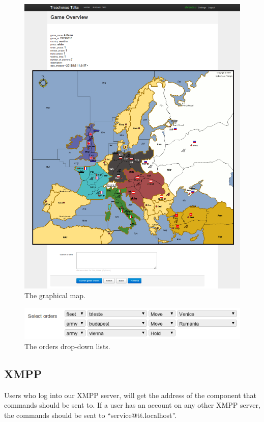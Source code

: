 \documentclass[11pt,a4paper]{report}
\begin{document}
\begin{figure}[h]
 \centering
 \includegraphics[width=\textwidth]{./graphics/graphicalmap.png}
 \caption{The graphical map.}
 \label{fig:map}
\end{figure}

\begin{figure}[h]
 \centering
 \includegraphics[width=\textwidth]{./graphics/orderssmall.png}
 \caption{The orders drop-down lists.}
 \label{fig:orders}
\end{figure}

\subsection{XMPP}
Users who log into our XMPP server, will get the address of the component that
commands should be sent to. If a user has an account on any other XMPP server,
the commands should be sent to ``service@tt.localhost''.
\end{document}
